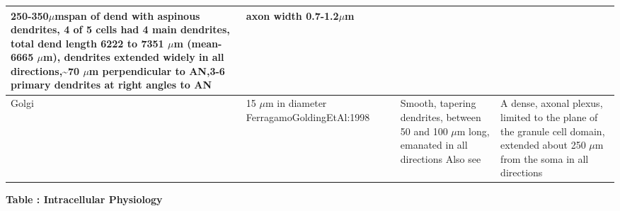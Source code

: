 \documentclass[10pt,a4paper]{article}
\newcommand{\um}{$\mu$m}
\begin{document}
\begin{flushleft}
\begin{supertabular}{|m{3.6859999cm}|m{3.6859999cm}|m{3.6859999cm}|m{3.6859999cm}|m{3.723cm}|}
250-350\um span of dend \citep{DoucetRyugo:1997} with aspinous dendrites, 4
of 5 cells had 4 main dendrites, total dend length 6222 to 7351 \um
(mean-6665 \um), dendrites extended widely in all directions,\~{}70 \um
perpendicular to AN,3-6 primary dendrites at right angles to AN
                    \citep{SmithRhode:1989}                      & axon width 0.7-1.2\um
\citep{OertelWuEtAl:1990}\\\hline
                             Golgi                               & 15 $\mu $m in diameter
                   FerragamoGoldingEtAl:1998                     & & Smooth, tapering dendrites, between 50 and 100
$\mu $m long, emanated in all directions \citep{FerragamoGoldingEtAl:1998}
        Also see \citep{Cant:1993,MugnainiOsenEtAl:1980}         & A dense, axonal plexus,
limited to the plane of the granule cell domain, extended about 250 $\mu $m
from the soma in all directions \citep{FerragamoGoldingEtAl:1998}
\\\hline
\end{supertabular}
\end{flushleft} 


{\bfseries Table : Intracellular  Physiology}
\end{document}
